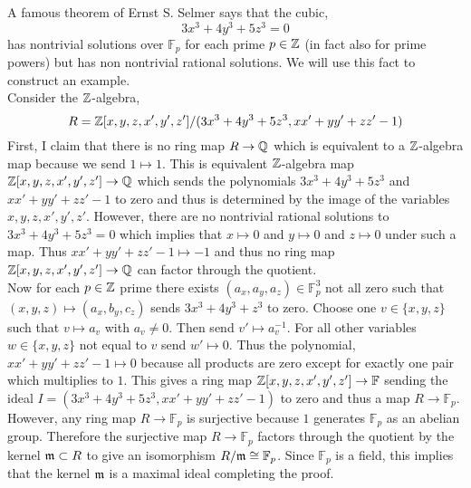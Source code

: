 \documentclass[12pt]{article}
\begin{document}
A famous theorem of Ernst S. Selmer says that the cubic,
\[ 3 x^3 + 4 y^3 + 5 z^3 = 0 \]
has nontrivial solutions over $\mathbb{F}_p$ for each prime $p \in \mathbb{Z}$ (in fact also for prime powers) but has non nontrivial rational solutions. We will use this fact to construct an example. 
\bigskip\\
Consider the $\mathbb{Z}$-algebra,
\[ R = \mathbb{Z}[x,y,z,x',y',z'] / (3 x^3 + 4 y^3 + 5 z^3, x x' + y y' + z z' - 1) \]
First, I claim that there is no ring map $R \to \mathbb{Q}$ which is equivalent to a $\mathbb{Z}$-algebra map because we send $1 \mapsto 1$. This is equivalent $\mathbb{Z}$-algebra map $\mathbb{Z}[x, y, z, x', y', z'] \to \mathbb{Q}$ which sends the polynomials $3 x^3 + 4 y^3 + 5 z^3$ and $x x' + y y' + z z' - 1$ to zero and thus is determined by the image of the variables $x, y, z, x', y', z'$. However, there are no nontrivial rational solutions to $3 x^3 + 4 y^3 + 5 z^3 = 0$ which implies that $x \mapsto 0$ and $y \mapsto 0$ and $z \mapsto 0$ under such a map. Thus $x x' + y y' + z z' - 1 \mapsto -1$ and thus no ring map $\mathbb{Z}[x, y, z, x', y', z'] \to \mathbb{Q}$ can factor through the quotient. 
\bigskip\\
Now for each $p \in \mathbb{Z}$ prime there exists $(a_x, a_y, a_z) \in \mathbb{F}_p^3$ not all zero such that $(x, y, z) \mapsto (a_x, b_y, c_z)$ sends $3 x^3 + 4 y^3 + z^3$ to zero. Choose one $v \in \{x, y, z\}$ such that $v \mapsto a_v$ with $a_v \neq 0$. Then send $v' \mapsto a_v^{-1}$. For all other variables $w \in \{ x, y, z \}$ not equal to $v$ send $w' \mapsto 0$. Thus the polynomial, $xx' + yy' + zz' - 1 \mapsto 0$ because all products are zero except for exactly one pair which multiplies to $1$. This gives a ring map $\mathbb{Z}[x, y, z, x', y', z'] \to \mathbb{F}$ sending the ideal $I = (3 x^3 + 4 y^3 + 5 z^3, x x' + y y' + z z' - 1)$ to zero and thus a map $R \to \mathbb{F}_p$. However, any ring map $R \to \mathbb{F}_p$ is surjective because $1$ generates $\mathbb{F}_p$ as an abelian group. Therefore the surjective map $R \to \mathbb{F}_p$ factors through the quotient by the kernel $\mathfrak{m} \subset R$ to give an isomorphism $R / \mathfrak{m} \cong \mathbb{F}_p$. Since $\mathbb{F}_p$ is a field, this implies that the kernel $\mathfrak{m}$ is a maximal ideal completing the proof. 
\end{document}
